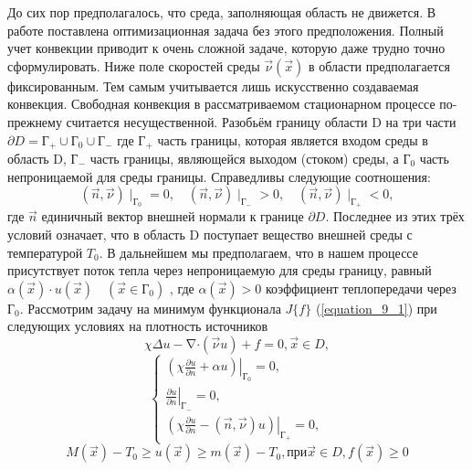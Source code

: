 До сих пор предполагалось, что среда, заполняющая область не движется. В работе \cite{literature_brusencev_2013} поставлена оптимизационная задача без этого предположения. Полный учет конвекции приводит к очень сложной задаче, которую даже трудно точно сформулировать. Ниже поле скоростей среды $\vec{\nu}(\vec x)$ в области предполагается фиксированным. Тем самым учитывается лишь искусственно создаваемая конвекция. Свободная конвекция в рассматриваемом стационарном процессе по-прежнему считается несущественной. Разобьём границу области D на три части $\partial D{=}Г_+{\cup}Г_0{\cup}Г_-$ где $Г_+$ часть границы, которая является входом среды в область D, $Г_-$ часть границы, являющейся выходом (стоком) среды, а $Г_0$ часть непроницаемой для среды границы. Справедливы следующие соотношения:\[(\vec{n},\vec{\nu}){\mid}_{Г_0}=0,\quad (\vec{n},\vec{\nu}){\mid}_{Г_-}>0,\quad (\vec n,\vec{\nu}){\mid}_{Г_+}<0,\]
где $\vec n$ единичный вектор внешней нормали к границе $\partial D$. Последнее из этих трёх условий означает, что в область D поступает вещество внешней среды с температурой $T_0$. В дальнейшем мы предполагаем, что в нашем процессе присутствует поток тепла через непроницаемую для среды границу, равный $\alpha(\vec x){\cdot}u(\vec x)\quad(\vec x{\in}Г_0)$ , где $\alpha(\vec x){>}0$ коэффициент теплопередачи через $Г_0$. Рассмотрим задачу на минимум функционала $J\{f\}$ (\ref{equation_9_1}) при следующих условиях на плотность источников
 		\begin{equation} \label{equation_9_8}
        \chi\Delta u-\mathop{\nabla}\cdot(\vec\nu u)+f=0, \vec x\in D,
        \end{equation}
        \begin{equation}\label{equation_9_9}
        \begin{cases}
        \displaystyle\left.\left( \chi\frac{\partial u}{\partial n}+\alpha u\right)\right|_{Г_0}=0,\\
        \displaystyle\left.\frac{\partial u}{\partial n}\right|_{Г_-}=0,\\
        \displaystyle\left.\left( \chi\frac{\partial u}{\partial n}-(\vec n,\vec\nu)u\right)\right|_{Г_+}=0,
        \end{cases}
        \end{equation}
        \begin{equation} \label{equation_9_10}
        M(\vec x)-T_0\ge u(\vec x)\ge m(\vec x)-T_0,при \vec x\in D,f(\vec x)\ge 0
        \end{equation}
